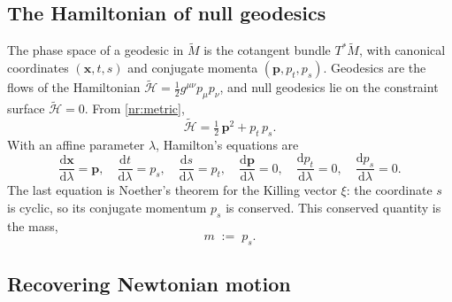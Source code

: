 \subsection{The Hamiltonian of null geodesics}

The phase space of a geodesic in $\tilde M$ is the cotangent bundle
$T^*\tilde M$, with canonical coordinates $(\mathbf{x},t,s)$ and conjugate
momenta $(\mathbf{p},p_t,p_s)$. Geodesics are the flows of the Hamiltonian
$\tilde{\mathcal{H}}=\tfrac12 g^{\mu\nu}p_\mu p_\nu$, and null geodesics lie
on the constraint surface $\tilde{\mathcal{H}}=0$. From \eqref{nr:metric},
\begin{equation}
  \tilde{\mathcal{H}}=\tfrac12\,\mathbf{p}^2+p_t\,p_s .
  \label{nr:Htilde}
\end{equation}
With an affine parameter $\lambda$, Hamilton's equations are
\begin{equation}
  \frac{\mathrm{d}\mathbf{x}}{\mathrm{d}\lambda}=\mathbf{p},\quad
  \frac{\mathrm{d}t}{\mathrm{d}\lambda}=p_s,\quad
  \frac{\mathrm{d}s}{\mathrm{d}\lambda}=p_t,\quad
  \frac{\mathrm{d}\mathbf{p}}{\mathrm{d}\lambda}=0,\quad
  \frac{\mathrm{d}p_t}{\mathrm{d}\lambda}=0,\quad
  \frac{\mathrm{d}p_s}{\mathrm{d}\lambda}=0 .
  \label{nr:hamiltonEq}
\end{equation}
The last equation is Noether's theorem for the Killing vector $\xi$: the
coordinate $s$ is cyclic, so its conjugate momentum $p_s$ is conserved. This
conserved quantity is the mass,
\begin{equation}
  m\;:=\;p_s .
  \label{nr:mass}
\end{equation}

\subsection{Recovering Newtonian motion}

